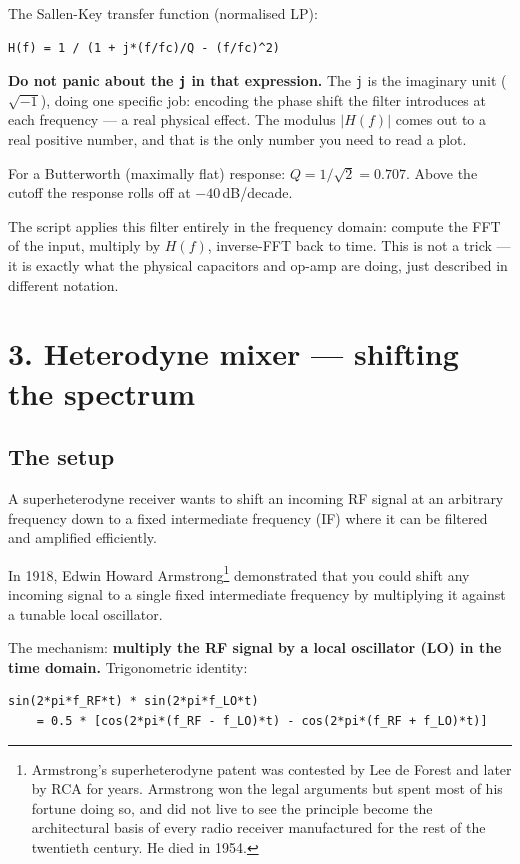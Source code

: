 \documentclass[11pt,a4paper,openany]{book}
\begin{document}
The Sallen-Key transfer function (normalised LP):
\begin{lstlisting}[style=shaddata]
H(f) = 1 / (1 + j*(f/fc)/Q - (f/fc)^2)
\end{lstlisting}

\textbf{Do not panic about the \texttt{j} in that expression.} The \texttt{j}
is the imaginary unit ($\sqrt{-1}$), doing one specific job: encoding the
phase shift the filter introduces at each frequency --- a real physical effect.
The modulus $|H(f)|$ comes out to a real positive number, and that is the only
number you need to read a plot.

For a Butterworth (maximally flat) response: $Q = 1/\sqrt{2} = 0.707$. Above
the cutoff the response rolls off at $-40$\,dB/decade.

The script applies this filter entirely in the frequency domain: compute the
FFT of the input, multiply by $H(f)$, inverse-FFT back to time. This is not a
trick --- it is exactly what the physical capacitors and op-amp are doing, just
described in different notation.

\section{3. Heterodyne mixer --- shifting the spectrum}

\subsection{The setup}

A superheterodyne receiver wants to shift an incoming RF signal at an
arbitrary frequency down to a fixed intermediate frequency (IF) where it can
be filtered and amplified efficiently.

In 1918, Edwin Howard Armstrong\footnote{Armstrong's superheterodyne patent
was contested by Lee de Forest and later by RCA for years. Armstrong won the
legal arguments but spent most of his fortune doing so, and did not live to see
the principle become the architectural basis of every radio receiver manufactured
for the rest of the twentieth century. He died in 1954.}
demonstrated that you could shift any incoming signal to a single fixed
intermediate frequency by multiplying it against a tunable local oscillator.

The mechanism: \textbf{multiply the RF signal by a local oscillator (LO) in
the time domain.} Trigonometric identity:
\begin{lstlisting}[style=shaddata]
sin(2*pi*f_RF*t) * sin(2*pi*f_LO*t)
    = 0.5 * [cos(2*pi*(f_RF - f_LO)*t) - cos(2*pi*(f_RF + f_LO)*t)]
\end{lstlisting}
\end{document}
